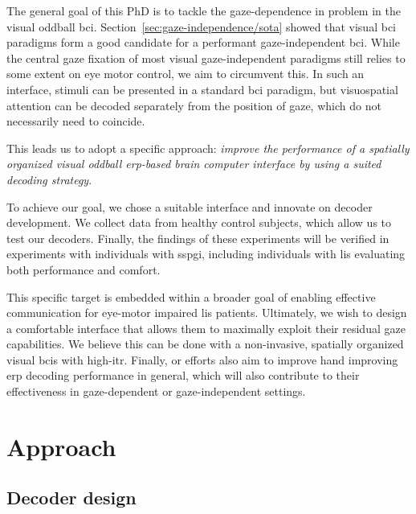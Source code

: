 The general goal of this PhD is to tackle the gaze-dependence in problem in the
visual oddball \ac{bci}.
Section~\ref{sec:gaze-independence/sota} showed that visual \ac{bci} paradigms form
a good candidate for a performant gaze-independent \ac{bci}.
While the central gaze fixation of most visual gaze-independent paradigms still
relies to some extent on eye motor control, we aim to circumvent this.
In such an interface, stimuli can be presented in a standard \ac{bci} paradigm, but
visuospatial attention can be decoded separately from the position of gaze,
which do not necessarily need to coincide.

This leads us to adopt a specific approach: \emph{improve the performance of a
spatially organized visual oddball \ac{erp}-based brain
computer interface by using a suited decoding strategy}.

To achieve our goal, we chose a suitable interface and innovate on decoder
development.
We collect data from healthy control subjects, which allow us to test our decoders.
Finally, the findings of these experiments will be verified in experiments with
individuals with \ac{sspgi}, including individuals with \ac{lis} evaluating
both performance and comfort.

This specific target is embedded within a broader goal of enabling
effective communication for eye-motor impaired \ac{lis} patients.
Ultimately, we wish to design a comfortable interface that allows them to maximally exploit
their residual gaze capabilities.
We believe this can be done with a non-invasive, spatially
organized visual \acp{bci} with high-\ac{itr}.
Finally, or efforts also aim to improve hand improving \ac{erp} decoding performance
in general, which will also contribute to their effectiveness in gaze-dependent
or gaze-independent settings.

\section{Approach}


\subsection{Decoder design}

